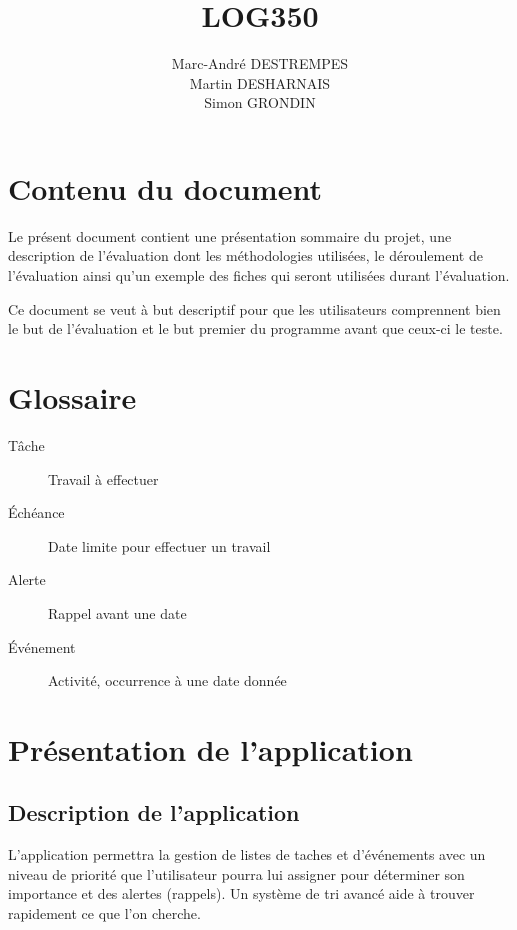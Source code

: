 \documentclass[letterpaper, oneside, 12pt,these,creativecommons]{thETS}
\title{LOG350}
\author{Marc-André DESTREMPES\\Martin DESHARNAIS\\Simon GRONDIN}
\begin{document}



\tableofcontents

\listoftables


\chapter{Contenu du document}

Le présent document contient une présentation sommaire du projet, une description de l'évaluation dont les méthodologies utilisées, le déroulement de l'évaluation ainsi qu'un exemple des fiches qui seront utilisées durant l'évaluation.

Ce document se veut à but descriptif pour que les utilisateurs comprennent bien le but de l'évaluation et le but premier du programme avant que ceux-ci le teste.

\chapter{Glossaire}

\begin{description}
\item [Tâche] Travail à effectuer
\item [Échéance] Date limite pour effectuer un travail
\item [Alerte] Rappel avant une date
\item [Événement] Activité, occurrence à une date donnée
\end{description}

\glsaddall
\printglossaries

\chapter{Présentation de l'application}

\section{Description de l'application}

L’application permettra la gestion de listes de taches et d’événements avec un niveau de priorité que l’utilisateur pourra lui assigner pour déterminer son importance et des alertes (rappels). Un système de tri avancé aide à trouver rapidement ce que l’on cherche. 
\end{document}
